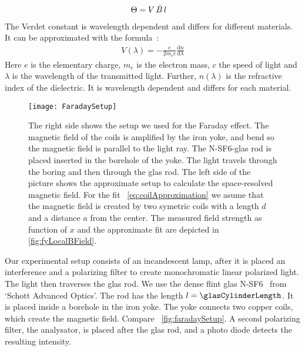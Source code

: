 \documentclass[a4paper,10pt,twocolumn]{article}
\newcommand{\NSF}{N-SF6}
\begin{document}
    \begin{align}
        \label{eq:VerdetTheta}
        \Theta &= V \, \bar{B} \, l
    \end{align}
    The Verdet constant is wavelength dependent and differs for different materials.
    It can be approximated with the formula~\cite{gerth}:
    \begin{align}
        \label{eq:TheoVerdetCurve}
        V(\lambda) = - \frac{e}{2 m_e c} \frac{\mathrm{d}n}{\mathrm{d}\lambda}
    \end{align}
    Here $e$ is the elementary charge, $m_e$ is the electron mass, $c$ the speed of light and
    $\lambda$ is the wavelength of the transmitted light.
    Further, $n(\lambda)$ is the refractive index of the dielectric.
    It is wavelength dependent and differs for each material.

    \begin{figure}[htbp]
        \texttt{[image: FaradaySetup]}
        \centering
        \caption{
            The right side shows the setup we used for the Faraday effect.
            The magnetic field of the coils is amplified by the iron yoke, and bend so the magnetic field
            is parallel to the light ray.
            The \NSF-glas rod is placed inserted in the borehole of the yoke.
            The light travels through the boring and then through the glas rod.
            The left side of the picture shows the approximate setup to calculate the space-resolved magnetic field.
            For the fit ~\eqref{eq:coilApproximation} we asume that the magnetic field is created by two symetric coils
            with a length $d$ and a distance $a$ from the center.
            The measured field strength as function of $x$ and the approximate fit are depicted in \autoref{fig:fyLocalBField}.
        }
        \label{fig:faradaySetup}
    \end{figure}

    Our experimental setup consists of an incandescent lamp, after it is placed an interference and a
    polarizing filter to create monochromatic linear polarized light.
    The light then traverses the glas rod.
    We use the dense flint glas \NSF ~\cite{glassTubeDatasheet} from `Schott Advanced Optics'.
    The rod has the length $l = \glasCylinderLength$.
    It is placed inside a borehole in the iron yoke.
    The yoke connects two copper coils, which create the magnetic field.
    Compare ~\autoref{fig:faradaySetup}.
    A second polarizing filter, the analysator, is placed after the glas rod,
    and a photo diode detects the resulting intensity.
\end{document}

